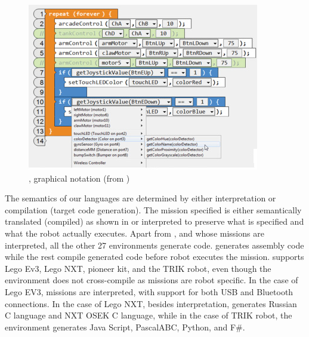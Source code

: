 \begin{figure}[t]
	\centering
		\includegraphics[width=\columnwidth]{robotCgraphical.png}	\caption{\robotc, graphical notation (from \cite{Schunn2017}) }
	\label{fig:robotcgraphical}
\end{figure}




\parhead{\fsemantics} The semantics of our languages are determined by either interpretation or compilation (target code generation). The mission specified is either semantically translated (compiled) as shown in   or interpreted to preserve what is specified and what the robot actually executes. Apart from \lego, and \codelab whose missions are interpreted, all the other 27 environments generate code. \metabot generates assembly code while the rest compile generated code before robot executes the mission.  \trik supports Lego Ev3, Lego NXT, pioneer kit, and the TRIK robot, even though the environment does not cross-compile as missions are robot specific. In the case of Lego EV3, missions are interpreted, with support for both USB and Bluetooth connections.
In the case of Lego NXT, besides interpretation, \trik generates Russian C language and NXT OSEK C language, while in the case of TRIK robot, the environment generates Java Script, PascalABC, Python, and F\#.%

